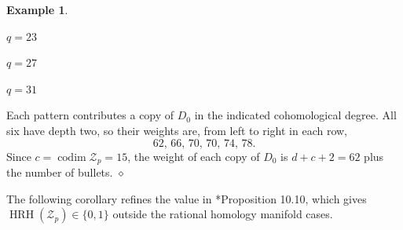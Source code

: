 \documentclass[12pt]{amsart}
\theoremstyle{definition}
\newtheorem{example}[theorem]{Example}
\numberwithin{equation}{section}
\begin{document}
\begin{example}
\begin{center}
\begin{minipage}[t]{.32\textwidth}
\par\smallskip $q=23$
\end{minipage}\hfill
\begin{minipage}[t]{.32\textwidth}
\centering
{}
\par\smallskip $q=27$
\end{minipage}\hfill
\begin{minipage}[t]{.32\textwidth}
\centering
{}
\par\smallskip $q=31$
\end{minipage}
\end{center}
\endgroup

\medskip

Each pattern contributes a copy of $D_0$ in the indicated
cohomological degree. All six have depth two, so their
weights are, from left to right in each row,
\[
62,\,66,\,70,\,70,\,74,\,78.
\]
Since $c=\operatorname{codim}\mathscr Z_p=15$,
the weight of each copy of $D_0$ is $d+c+2=62$ plus
the number of bullets. \hfill\mbox{$\diamond$}
\end{example}

The following corollary refines the value in
\cite{DORhrh}*{Proposition 10.10}, which gives
$\operatorname{HRH}(\mathscr Z_p)\in\{0,1\}$ outside the
rational homology manifold cases.
\end{document}
